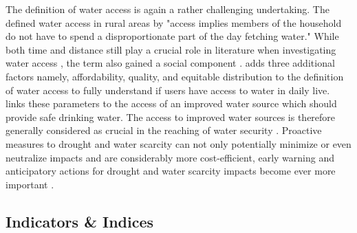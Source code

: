 The definition of water access is again a rather challenging undertaking. The \autocite[254]{worldbankWorldDevelopmentReport1997} defined water access in rural areas by "access implies members of the household do not have to spend a disproportionate part of the day fetching water." While both time and distance still play a crucial role in literature when investigating water access \autocite{cassiviDrinkingWaterAccessibility2019,cassiviEvaluatingSelfreportedMeasures2021,emenikeAccessingSafeDrinking2017}, the term also gained a social component \autocite{emenikeAccessingSafeDrinking2017,mitlinUnaffordableUndrinkable}. \autocite{obeng-odoomAccessWater2012} adds three additional factors namely, affordability, quality, and equitable distribution to the definition of water access to fully understand if users have access to water in daily live. \autocite{unitednations/developmentprogrammeDeepeningDemocracyFragmented2002} links these parameters to the access of an improved water source which should provide safe drinking water. The access to improved water sources is therefore generally considered as crucial in the reaching of water security \autocite{cdcAssessingAccessWater2022}.\newline 
Proactive measures to drought and water scarcity can not only potentially minimize or even neutralize impacts and are considerably more cost-efficient, early warning and anticipatory actions for drought and water scarcity impacts become ever more important \autocite{faoandun-waterProgressLevelWater2021,idmpDroughtWaterScarcity2022,worldbankHighDryClimate2016}.


\subsection{Indicators \& Indices}\label{subsec:indicators} %

